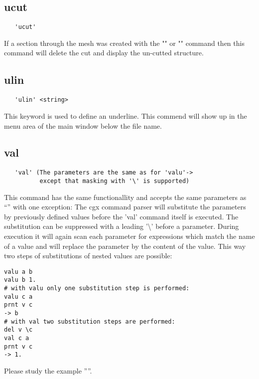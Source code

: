 \documentclass{article}
\begin{document}
\subsection{\label{ucut}ucut}
\begin{verbatim}
   'ucut'
\end{verbatim}
If a section through the mesh was created with the "" or "" command then this command will delete the cut and display the un-cutted structure.

\subsection{\label{ulin}ulin}
\begin{verbatim}
   'ulin' <string> 
\end{verbatim}
This keyword is used to define an underline. This commend will show up in the menu area of the main window below the file name. 

\subsection{\label{val}val}
\begin{verbatim}
   'val' (The parameters are the same as for 'valu'->
          except that masking with '\' is supported)
\end{verbatim}
This command has the same functionallity and accepts the same parameters as ``'' with one exception: The cgx command parser will substitute the parameters by previously defined values before the 'val' command itself is executed. The substitution can be suppressed with a leading '\textbackslash{}' before a parameter. During execution it will again scan each parameter for expressions which match the name of a value and will replace the parameter by the content of the value. This way two steps of substitutions of nested values are possible:
\begin{verbatim}
valu a b
valu b 1.
# with valu only one substitution step is performed:
valu c a
prnt v c
-> b
# with val two substitution steps are performed:
del v \c
val c a
prnt v c
-> 1.
\end{verbatim}
Please study the example ''''.
\end{document}
